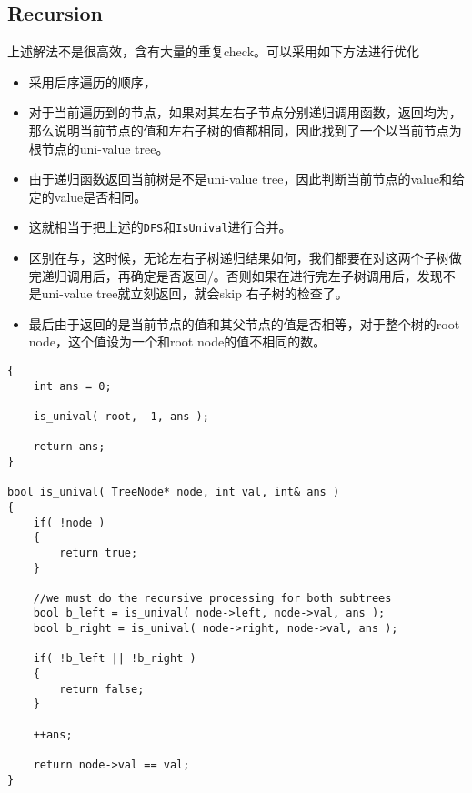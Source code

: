 \subsection{Recursion}
上述解法不是很高效，含有大量的重复check。可以采用如下方法进行优化
\begin{itemize}
\item 采用后序遍历的顺序，
\item 对于当前遍历到的节点，如果对其左右子节点分别递归调用函数，返回均为，那么说明当前节点的值和左右子树的值都相同，因此找到了一个以当前节点为根节点的uni-value tree。
\item 由于递归函数返回当前树是不是uni-value tree，因此判断当前节点的value和给定的value是否相同。
\item 这就相当于把上述的\texttt{DFS}和\texttt{IsUnival}进行合并。
\item 区别在与，这时候，无论左右子树递归结果如何，我们都要在对这两个子树做完递归调用后，再确定是否返回/。否则如果在进行完左子树调用后，发现不是uni-value tree就立刻返回，就会skip 右子树的检查了。
\item 最后由于返回的是当前节点的值和其父节点的值是否相等，对于整个树的root node，这个值设为一个和root node的值不相同的数。
\end{itemize}

\begin{lstlisting}[style=customc,caption={More Efficient Recursive Approach}]
{
    int ans = 0;

    is_unival( root, -1, ans );

    return ans;
}

bool is_unival( TreeNode* node, int val, int& ans )
{
    if( !node )
    {
        return true;
    }

    //we must do the recursive processing for both subtrees
    bool b_left = is_unival( node->left, node->val, ans );
    bool b_right = is_unival( node->right, node->val, ans );

    if( !b_left || !b_right )
    {
        return false;
    }

    ++ans;

    return node->val == val;
}
\end{lstlisting}